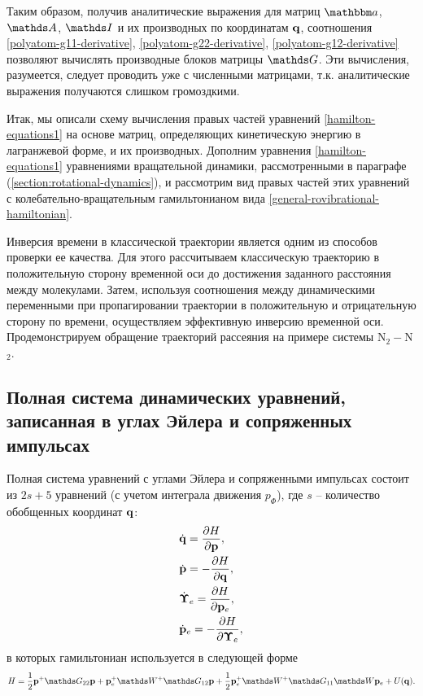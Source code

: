 Таким образом, получив аналитические выражения для матриц $\bba$, $\bbA$, $\bbI$ и их производных по координатам $\mathbf{q}$, соотношения \eqref{polyatom-g11-derivative}, \eqref{polyatom-g22-derivative}, \eqref{polyatom-g12-derivative} позволяют вычислять производные блоков матрицы $\bbG$. Эти вычисления, разумеется, следует проводить уже с численными матрицами, т.к. аналитические выражения получаются слишком громоздкими. \par
Итак, мы описали схему вычисления правых частей уравнений \eqref{hamilton-equations1} на основе матриц, определяющих кинетическую энергию в лагранжевой форме, и их производных. Дополним уравнения \eqref{hamilton-equations1} уравнениями вращательной динамики, рассмотренными в параграфе (\ref{section:rotational-dynamics}), и рассмотрим вид правых частей этих уравнений с колебательно-вращательным гамильтонианом вида \eqref{general-rovibrational-hamiltonian}. \par
Инверсия времени в классической траектории является одним из способов проверки ее качества. Для этого рассчитываем классическую траекторию в положительную сторону временной оси до достижения заданного расстояния между молекулами. Затем, используя соотношения между динамическими переменными при пропагировании траектории в положительную и отрицательную сторону по времени, осуществляем эффективную инверсию временной оси. Продемонстрируем обращение траекторий рассеяния на примере системы N$_2-$N$_2$. 

\subsection{Полная система динамических уравнений, записанная в углах Эйлера и сопряженных импульсах}
    Полная система уравнений с углами Эйлера и сопряженными импульсах состоит из $2s + 5$ уравнений (с учетом интеграла движения $p_\Phi$), где $s$ -- количество обобщенных координат $\mathbf{q}$:
\begin{gather}
    \begin{aligned}
        &\dot{\mathbf{q}} = \frac{\partial H}{\partial \mathbf{p}}, \\
        &\dot{\mathbf{p}} = -\frac{\partial H}{\partial \mathbf{q}}, \\
        &\dot{\boldsymbol{\Upsilon}}_e = \frac{\partial H}{\partial \mathbf{p}_e}, \\
        &\dot{\mathbf{p}}_e = - \frac{\partial H}{\partial \boldsymbol{\Upsilon}_e},
    \end{aligned} \label{full-system-euler}
\end{gather}
%
в которых гамильтониан используется в следующей форме
\begin{gather}
    H = \frac{1}{2} \mf{p}^+ \bbG_{22} \mf{p} + \mf{p}^+_e \bbW^+ \bbG_{12} \mf{p} + \frac{1}{2} \mf{p}^+_e \bbW^+ \bbG_{11} \bbW \pe + U(\mf{q}). \label{general-rovibrational-hamiltonian-euler}
\end{gather}

